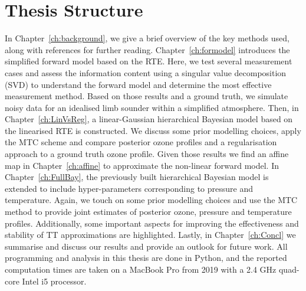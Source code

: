 \section{Thesis Structure}
In Chapter~\ref{ch:background}, we give a brief overview of the key methods used, along with references for further reading.
Chapter~\ref{ch:formodel} introduces the simplified forward model based on the RTE.
Here, we test several measurement cases and assess the information content using a singular value decomposition (SVD) to understand the forward model and determine the most effective measurement method.
Based on those results and a ground truth, we simulate noisy data for an idealised limb sounder within a simplified atmosphere.
Then, in Chapter~\ref{ch:LinVsReg}, a linear-Gaussian hierarchical Bayesian model based on the linearised RTE is constructed.
We discuss some prior modelling choices, apply the MTC scheme and compare posterior ozone profiles and a regularisation approach to a ground truth ozone profile.
Given those results we find an affine map in Chapter~\ref{ch:affine} to approximate the non-linear forward model.
In Chapter~\ref{ch:FullBay}, the previously built hierarchical Bayesian model is extended to include hyper-parameters corresponding to pressure and temperature.
Again, we touch on some prior modelling choices and use the MTC method to provide joint estimates of posterior ozone, pressure and temperature profiles.
Additionally, some important aspects for improving the effectiveness and stability of TT approximations are highlighted.
Lastly, in Chapter~\ref{ch:Concl} we summarise and discuss our results and provide an outlook for future work.
All programming and analysis in this thesis are done in Python, and the reported computation times are taken on a MacBook Pro from 2019 with a 2.4 GHz quad-core Intel i5 processor.
